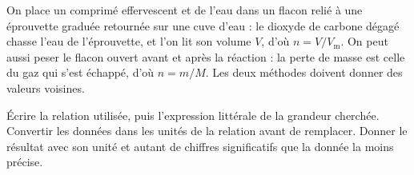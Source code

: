 \begin{experience}
On place un comprimé effervescent et de l'eau dans un flacon relié à une éprouvette graduée retournée sur une cuve d'eau :
le dioxyde de carbone dégagé chasse l'eau de l'éprouvette, et l'on lit son volume $V$, d'où $n=V/V_\mathrm{m}$. On peut aussi
peser le flacon ouvert avant et après la réaction : la perte de masse est celle du gaz qui s'est échappé, d'où $n=m/M$. Les
deux méthodes doivent donner des valeurs voisines.
\end{experience}
\begin{rediger}
Écrire la relation utilisée, puis l'expression littérale de la grandeur cherchée. Convertir les données dans les unités
de la relation avant de remplacer. Donner le résultat avec son unité et autant de chiffres significatifs que la donnée la
moins précise.
\end{rediger}
\exercices

